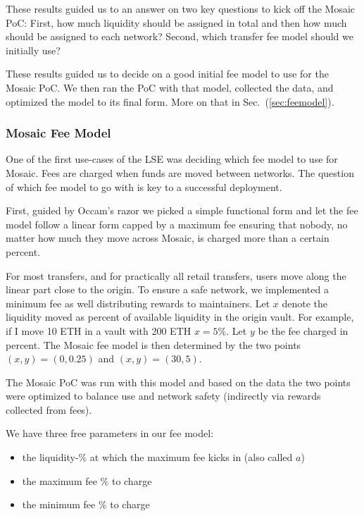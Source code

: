 These results guided us to an answer on two key questions to kick off the Mosaic PoC: First, how much liquidity should be assigned in total and then how much should be assigned to each network? Second, which transfer fee model should we initially use?

These results guided us to decide on a good initial fee model to use for the Mosaic PoC. We then ran the PoC with that model, collected the data, and optimized the model to its final form. More on that in Sec.~(\ref{sec:feemodel}).

\subsubsection{Mosaic Fee Model\label{sec:feemodel}}

One of the first use-cases of the LSE was deciding which fee model to use for Mosaic.
%
Fees are charged when funds are moved between networks. The question of which fee model to go with is key to a successful deployment.

First, guided by Occam's razor \cite{WhatRazor} we picked a simple functional form and let the fee model follow a linear form capped by a maximum fee ensuring that nobody, no matter how much they move across Mosaic, is charged more than a certain percent.

For most transfers, and for practically all retail transfers, users move along the linear part close to the origin.
%
To ensure a safe network, we implemented a minimum fee as well distributing rewards to maintainers. Let $x$ denote the liquidity moved as percent of available liquidity in the origin vault. For example, if I move 10 ETH in a vault with 200 ETH $x=5$\%. Let $y$ be the fee charged in percent. The Mosaic fee model is then determined by the two points $(x,y)=(0,0.25)$ and $(x,y)=(30,5)$.

The Mosaic PoC was run with this model and based on the data the two points were optimized to balance use and network safety (indirectly via rewards collected from fees).

We have three free parameters in our fee model:
\begin{itemize}
    \item the liquidity-\% at which the maximum fee kicks in (also called $a$)
    \item the maximum fee \% to charge
    \item the minimum fee \% to charge
\end{itemize}

